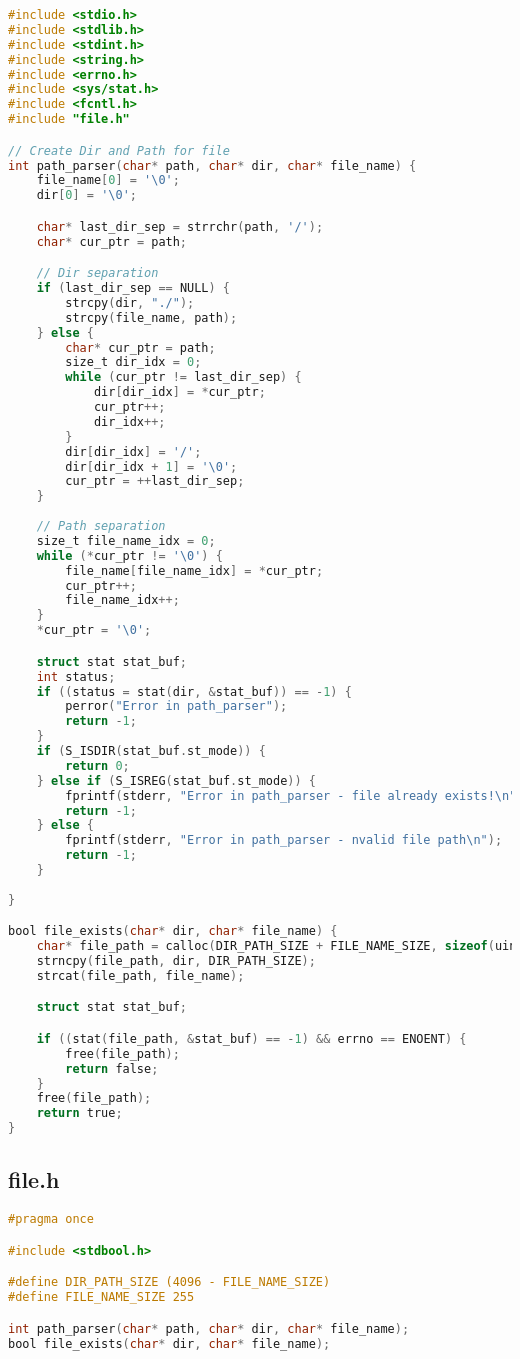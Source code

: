 \begin{lstlisting}[language=C, caption=file.c]
#include <stdio.h>
#include <stdlib.h>
#include <stdint.h>
#include <string.h>
#include <errno.h>
#include <sys/stat.h>
#include <fcntl.h>
#include "file.h"

// Create Dir and Path for file
int path_parser(char* path, char* dir, char* file_name) {
    file_name[0] = '\0';
    dir[0] = '\0';

    char* last_dir_sep = strrchr(path, '/');
    char* cur_ptr = path;

    // Dir separation
    if (last_dir_sep == NULL) {
        strcpy(dir, "./");
        strcpy(file_name, path);
    } else {    
        char* cur_ptr = path;
        size_t dir_idx = 0;
        while (cur_ptr != last_dir_sep) {
            dir[dir_idx] = *cur_ptr;
            cur_ptr++;
            dir_idx++;
        }
        dir[dir_idx] = '/';
        dir[dir_idx + 1] = '\0';
        cur_ptr = ++last_dir_sep;
    }
    
    // Path separation
    size_t file_name_idx = 0;
    while (*cur_ptr != '\0') {
        file_name[file_name_idx] = *cur_ptr;
        cur_ptr++;
        file_name_idx++;
    }
    *cur_ptr = '\0';

    struct stat stat_buf;
    int status;
    if ((status = stat(dir, &stat_buf)) == -1) {
        perror("Error in path_parser");
        return -1;
    }
    if (S_ISDIR(stat_buf.st_mode)) {
        return 0;
    } else if (S_ISREG(stat_buf.st_mode)) {
        fprintf(stderr, "Error in path_parser - file already exists!\n");
        return -1;
    } else {
        fprintf(stderr, "Error in path_parser - nvalid file path\n");
        return -1;
    }
    
}

bool file_exists(char* dir, char* file_name) {
    char* file_path = calloc(DIR_PATH_SIZE + FILE_NAME_SIZE, sizeof(uint8_t));
    strncpy(file_path, dir, DIR_PATH_SIZE);
    strcat(file_path, file_name);

    struct stat stat_buf;

    if ((stat(file_path, &stat_buf) == -1) && errno == ENOENT) {
        free(file_path);
        return false;
    }
    free(file_path);
    return true;
}

\end{lstlisting}

\subsection{file.h}

\begin{lstlisting}[language=C, caption=file.h]
#pragma once

#include <stdbool.h>

#define DIR_PATH_SIZE (4096 - FILE_NAME_SIZE)
#define FILE_NAME_SIZE 255

int path_parser(char* path, char* dir, char* file_name);
bool file_exists(char* dir, char* file_name);

\end{lstlisting}